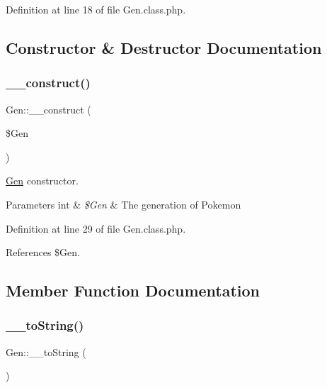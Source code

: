 Definition at line 18 of file Gen.\+class.\+php.



\subsection{Constructor \& Destructor Documentation}
\mbox{\label{class_gen_a0a565a32c339432838c841580ff38a72}} 
\subsubsection{\texorpdfstring{\+\_\+\+\_\+construct()}{\_\_construct()}}
{\footnotesize\ttfamily Gen\+::\+\_\+\+\_\+construct (\begin{DoxyParamCaption}\item[{}]{\$\+Gen }\end{DoxyParamCaption})}

\hyperlink{class_gen}{Gen} constructor. 
\begin{DoxyParams}[1]{Parameters}
int & {\em \$\+Gen} & The generation of Pokemon \\
\hline
\end{DoxyParams}


Definition at line 29 of file Gen.\+class.\+php.



References \$\+Gen.



\subsection{Member Function Documentation}
\mbox{\label{class_gen_a552f7d82c7054c2086a97761c59a09aa}} 
\subsubsection{\texorpdfstring{\+\_\+\+\_\+to\+String()}{\_\_toString()}}
{\footnotesize\ttfamily Gen\+::\+\_\+\+\_\+to\+String (\begin{DoxyParamCaption}{ }\end{DoxyParamCaption})}



